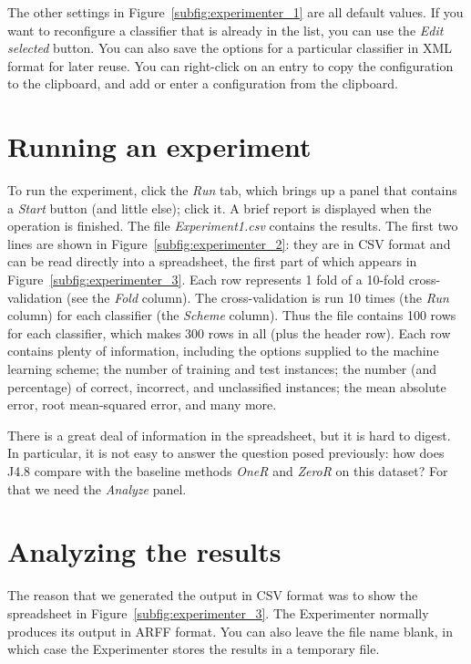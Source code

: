 The other settings in Figure~\ref{subfig:experimenter_1} are all
default values. If you want to reconfigure a classifier that is already
in the list, you can use the \textit{Edit selected} button. You can
also save the options for a particular classifier in XML format for
later reuse. You can right-click on an entry to copy the configuration
to the clipboard, and add or enter a configuration from the clipboard.

\section{Running an experiment}

To run the experiment, click the \textit{Run} tab, which brings up a
panel that contains a \textit{Start} button (and little else); click
it. A brief report is displayed when the operation is finished. The
file \textit{Experiment1.csv} contains the results. The first two
lines are shown in Figure~\ref{subfig:experimenter_2}: they are in CSV
format and can be read directly into a spreadsheet, the first part of
which appears in Figure~\ref{subfig:experimenter_3}. Each row
represents 1 fold of a 10-fold cross-validation (see the \textit{Fold}
column). The cross-validation is run 10 times (the \textit{Run}
column) for each classifier (the \textit{Scheme} column). Thus the
file contains 100 rows for each classifier, which makes 300 rows in
all (plus the header row). Each row contains plenty of information,
including the options supplied to the machine learning scheme; the
number of training and test instances; the number (and percentage) of
correct, incorrect, and unclassified instances; the mean absolute
error, root mean-squared error, and many more.

There is a great deal of information in the spreadsheet, but it is
hard to digest. In particular, it is not easy to answer the question
posed previously: how does J4.8 compare with the baseline methods
\textit{OneR} and \textit{ZeroR} on this dataset? For that we need the
\textit{Analyze} panel.

\section{Analyzing the results}

The reason that we generated the output in CSV format was to show the
spreadsheet in Figure~\ref{subfig:experimenter_3}. The Experimenter
normally produces its output in ARFF format. You can also leave the
file name blank, in which case the Experimenter stores the results in
a temporary file.

